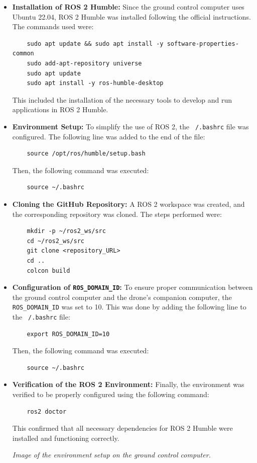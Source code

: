 \begin{itemize}
    \item \textbf{Installation of ROS 2 Humble:} 
    Since the ground control computer uses Ubuntu 22.04, ROS 2 Humble was installed following the official instructions. The commands used were:
    \begin{verbatim}
    sudo apt update && sudo apt install -y software-properties-common
    sudo add-apt-repository universe
    sudo apt update
    sudo apt install -y ros-humble-desktop
    \end{verbatim}
    This included the installation of the necessary tools to develop and run applications in ROS 2 Humble.

    \item \textbf{Environment Setup:} 
    To simplify the use of ROS 2, the \texttt{~/.bashrc} file was configured. The following line was added to the end of the file:
    \begin{verbatim}
    source /opt/ros/humble/setup.bash
    \end{verbatim}
    Then, the following command was executed:
    \begin{verbatim}
    source ~/.bashrc
    \end{verbatim}

    \item \textbf{Cloning the GitHub Repository:} 
    A ROS 2 workspace was created, and the corresponding repository was cloned. The steps performed were:
    \begin{verbatim}
    mkdir -p ~/ros2_ws/src
    cd ~/ros2_ws/src
    git clone <repository_URL>
    cd ..
    colcon build
    \end{verbatim}

    \item \textbf{Configuration of \texttt{ROS\_DOMAIN\_ID}:} 
    To ensure proper communication between the ground control computer and the drone's companion computer, the \texttt{ROS\_DOMAIN\_ID} was set to 10. This was done by adding the following line to the \texttt{~/.bashrc} file:
    \begin{verbatim}
    export ROS_DOMAIN_ID=10
    \end{verbatim}
    Then, the following command was executed:
    \begin{verbatim}
    source ~/.bashrc
    \end{verbatim}
    
    \item \textbf{Verification of the ROS 2 Environment:} 
    Finally, the environment was verified to be properly configured using the following command:
    \begin{verbatim}
    ros2 doctor
    \end{verbatim}
    This confirmed that all necessary dependencies for ROS 2 Humble were installed and functioning correctly.
    
    \begin{center} 
        \textit{Image of the environment setup on the ground control computer.} 
    \end{center}
\end{itemize}

